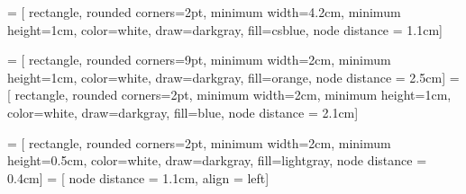 
 = [
rectangle, rounded corners=2pt, minimum width=4.2cm,
    minimum height=1cm, color=white, draw=darkgray, fill=csblue, node distance
= 1.1cm]

 = [
rectangle, rounded corners=9pt, minimum width=2cm,
    minimum height=1cm, color=white, draw=darkgray, fill=orange, node distance
= 2.5cm]
 = [
rectangle, rounded corners=2pt, minimum width=2cm,
    minimum height=1cm, color=white, draw=darkgray, fill=blue, node distance
= 2.1cm]

 = [
rectangle, rounded corners=2pt, minimum width=2cm,
    minimum height=0.5cm, color=white, draw=darkgray, fill=lightgray, node distance
= 0.4cm]
 = [
node distance = 1.1cm, align = left]

